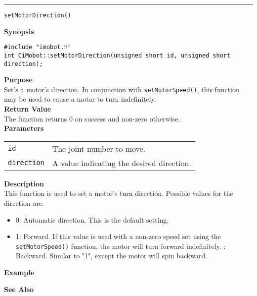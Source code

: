 \noindent
\vspace{5pt}
\rule{6.5in}{0.015in}
\noindent
{\LARGE \texttt{setMotorDirection()}}\\
{}

\noindent
{\bf Synopsis}\\
\begin{verbatim}
#include "imobot.h"
int CiMobot::setMotorDirection(unsigned short id, unsigned short direction);
\end{verbatim}

\noindent
{\bf Purpose}\\
Set's a motor's direction. In conjunction with \texttt{setMotorSpeed()}, this
function may be used to cause a motor to turn indefinitely.\\

\noindent
{\bf Return Value}\\
The function returns 0 on success and non-zero otherwise.\\

\noindent
{\bf Parameters}
\vspace{-0.1in}
\begin{description}
\item               
\begin{tabular}{p{20 mm}p{145 mm}}
\texttt{id} & The joint number to move. \\
\texttt{direction} & A value indicating the desired direction.
\end{tabular}
\end{description}

\noindent
{\bf Description}\\
This function is used to set a motor's turn direction. Possible values for the
direction are:
\begin{itemize}
\item 0: Automatic direction. This is the default setting. 
\item 1: Forward. If this value is used with a non-zero speed set using the
\texttt{setMotorSpeed()} function, the motor will turn forward indefinitely.
: Backward. Similar to "1", except the motor will spin backward.
\end{itemize}

\noindent
{\bf Example}\\
\noindent

\noindent
{\bf See Also}\\


